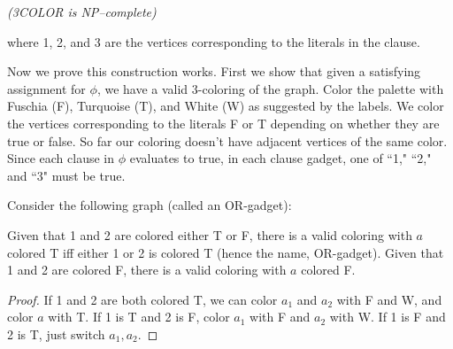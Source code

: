 \begin{problem}{\it(3COLOR is NP--complete)}
\begin{center}
\end{center}
where 1, 2, and 3 are the vertices corresponding to the literals in the clause.

Now we prove this construction works. First we show that given a satisfying assignment for $\phi$, we have a valid 3-coloring of the graph. Color the palette with Fuschia (F), Turquoise (T), and White (W) as suggested by the labels. We color the vertices corresponding to the literals F or T depending on whether they are true or false. So far our coloring doesn't have adjacent vertices of the same color. Since each clause in $\phi$ evaluates to true, in each clause gadget, one of ``1," ``2," and ``3" must be true. 

\begin{clm}
Consider the following graph (called an OR-gadget):
\begin{center}
\end{center}
Given that 1 and 2 are colored either T or F, there is a valid coloring with $a$ colored T iff either 1 or 2 is colored T (hence the name, OR-gadget). Given that 1 and 2 are colored F, there is a valid coloring with $a$ colored F.
\end{clm}
\begin{proof}
If 1 and 2 are both colored T, we can color $a_1$ and $a_2$ with F and W, and color $a$ with T. If 1 is T and 2 is F, color $a_1$ with F and $a_2$ with W. If 1 is F and 2 is T, just switch $a_1,a_2$.


\end{proof}
\end{problem}
